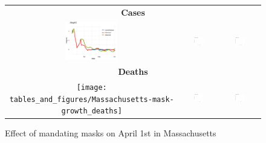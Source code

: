 \documentclass[11pt,reqno,letter]{amsart}
\theoremstyle{definition}
\begin{document}
\FloatBarrier

\begin{figure}[b]
  \caption{Effect of mandating masks on April 1st in Massachusetts \label{fig:MA-mask}}
  \begin{minipage}{\linewidth}
    \centering
    \begin{tabular}{ccc}
      \multicolumn{3}{c}{\textbf{Cases}} \\
      \includegraphics[width=0.31\textwidth]{tables_and_figures/Massachusetts-mask-growth}
      &
        \includegraphics[width=0.31\textwidth]{tables_and_figures/Massachusetts-mask-dgrowth_v1}
      &        \includegraphics[width=0.31\textwidth]{tables_and_figures/Massachusetts-mask-dcases_v1}
\\
      \multicolumn{3}{c}{\textbf{Deaths}} \\
     \texttt{[image: tables\_and\_figures/Massachusetts-mask-growth\_deaths]}
      &        \includegraphics[width=0.31\textwidth]{tables_and_figures/Massachusetts-mask-dgrowth_deaths_v1}
      &      \includegraphics[width=0.31\textwidth]{tables_and_figures/Massachusetts-mask-dcases_deaths_v1}

\end{tabular}
\end{minipage}
\end{figure}
\end{document}
